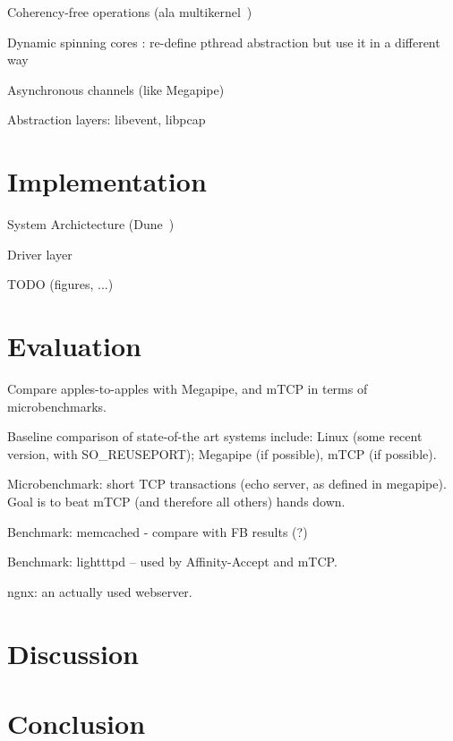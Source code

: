 \todo Coherency-free operations  (ala multikernel~\cite{DBLP:conf/sosp/BaumannBDHIPRSS09})

\todo Dynamic spinning cores : re-define pthread abstraction but use it in a different way

\todo Asynchronous channels (like Megapipe)

\todo Abstraction layers: libevent, libpcap


\section{Implementation}

\todo System Archictecture (Dune~\cite{belay2012dune})

\todo Driver layer

\todo TODO (figures, ...)

\section{Evaluation}


\todo Compare apples-to-apples with Megapipe, and mTCP in terms of microbenchmarks.

\todo Baseline comparison of state-of-the art systems include:  Linux (some recent version, with SO\_REUSEPORT); Megapipe (if possible), mTCP (if possible). 

\todo Microbenchmark: short TCP transactions (echo server, as defined in megapipe).   Goal is to beat mTCP (and therefore all others) hands down.

\todo Benchmark: memcached - compare with FB results (?)

\todo Benchmark: lightttpd -- used by Affinity-Accept and mTCP.  

\todo ngnx: an actually used webserver.


\section{Discussion}
\section{Conclusion}




